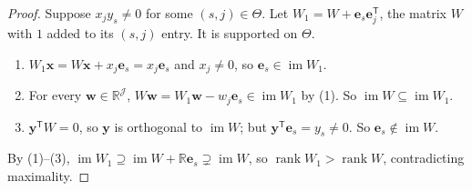 \documentclass[11pt]{article}
\theoremstyle{remark}
\DeclareMathOperator{\rank}{rank}
\DeclareMathOperator{\im}{im}
\newcommand{\R}{\mathbb R}
\newcommand{\tp}{^{\mathsf T}}
\newcommand{\bx}{\mathbf x}
\newcommand{\by}{\mathbf y}
\newcommand{\be}{\mathbf e}
\begin{document}
\begin{proof}
Suppose $x_jy_s\ne0$ for some $(s,j)\in\Theta$. Let
$W_1=W+\be_s\be_j\tp$, the matrix $W$ with $1$ added to its $(s,j)$ entry.
It is supported on $\Theta$.
\begin{enumerate}[label=(\arabic*),leftmargin=2em]
\item $W_1\bx=W\bx+x_j\be_s=x_j\be_s$ and $x_j\ne0$, so
$\be_s\in\im W_1$.
\item For every $\mathbf w\in\R^{\mathcal J}$,
$W\mathbf w=W_1\mathbf w-w_j\be_s\in\im W_1$ by (1). So
$\im W\subseteq\im W_1$.
\item $\by\tp W=0$, so $\by$ is orthogonal to $\im W$; but
$\by\tp\be_s=y_s\ne0$. So $\be_s\notin\im W$.
\end{enumerate}
By (1)--(3), $\im W_1\supseteq\im W+\R\be_s\supsetneq\im W$, so
$\rank W_1>\rank W$, contradicting maximality.
\end{proof}
\end{document}
